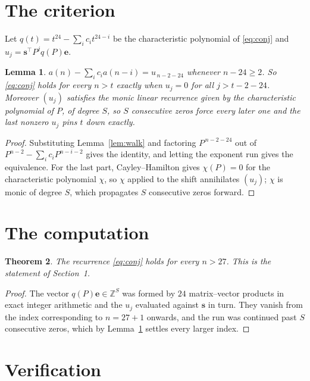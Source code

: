 \documentclass[11pt,a4paper]{article}
\theoremstyle{plain}
\newtheorem{theorem}{Theorem}
\newtheorem{lemma}[theorem]{Lemma}
\theoremstyle{definition}
\begin{document}
\section{The criterion}

Let $q(t)=t^{24}-\sum_i c_i t^{24-i}$ be the characteristic polynomial of
\eqref{eq:conj} and $u_j=\mathbf{s}^{\!\top}P^{j}q(P)\mathbf{e}$.

\begin{lemma}\label{lem:crit}
$a(n)-\sum_i c_i a(n-i)=u_{\,n-2-24}$ whenever $n-24\ge2$. So \eqref{eq:conj}
holds for every $n>t$ exactly when $u_j=0$ for all $j>t-2-24$. Moreover $(u_j)$
satisfies the monic linear recurrence given by the characteristic polynomial of $P$, of
degree $S$, so $S$ consecutive zeros force every later one and the last nonzero $u_j$ pins
$t$ down exactly.
\end{lemma}

\begin{proof}
Substituting Lemma~\ref{lem:walk} and factoring $P^{\,n-2-24}$ out of
$P^{n-2}-\sum_i c_i P^{n-i-2}$ gives the identity, and letting the exponent run gives the
equivalence. For the last part, Cayley--Hamilton gives $\chi(P)=0$ for the characteristic
polynomial $\chi$, so $\chi$ applied to the shift annihilates $(u_j)$; $\chi$ is monic of
degree $S$, which propagates $S$ consecutive zeros forward.
\end{proof}

\section{The computation}

\begin{theorem}
The recurrence \eqref{eq:conj} holds for every $n>27$. This is the statement of
Section~1.
\end{theorem}

\begin{proof}
The vector $q(P)\mathbf{e}\in\mathbb{Z}^{S}$ was formed by $24$ matrix--vector
products in exact integer arithmetic and the $u_j$ evaluated against $\mathbf{s}$ in turn.
They vanish from the index corresponding to $n=27+1$ onwards, and the run was continued
past $S$ consecutive zeros, which by Lemma~\ref{lem:crit} settles every larger index.
\end{proof}

\section{Verification}
\end{document}
